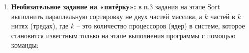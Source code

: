 \begin{enumerate}
    \item\textbf{Необязательное задание на «пятёрку»:} в п.3 задания на этапе Sort выполнить параллельную сортировку не двух частей массива, а $k$ частей в $k$ нитях (тредах), где $k$ – это количество процессоров (ядер) в системе, которое становится известным только на этапе выполнения программы с помощью команды:
\end{enumerate}
